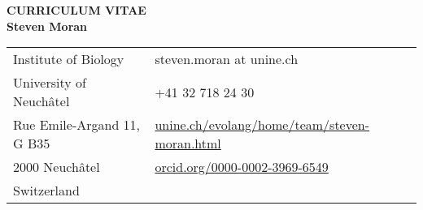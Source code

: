 \documentclass[11pt]{article}
\begin{document}
\pagestyle{empty}


\begin{center}
{\bf CURRICULUM VITAE\\Steven Moran}\\

\vskip 12pt

\begin{tabular}{ll}
%


Institute of Biology   & steven.moran at unine.ch \\
University of Neuchâtel & +41 32 718 24 30 \\
Rue Emile-Argand 11, G B35 & \href{https://www.unine.ch/evolang/home/team/steven-moran.html}{unine.ch/evolang/home/team/steven-moran.html} \\
2000 Neuchâtel & \href{https://orcid.org/0000-0002-3969-6549}{orcid.org/0000-0002-3969-6549} \\
Switzerland & \\
\end{tabular}
\end{center}
\end{document}
